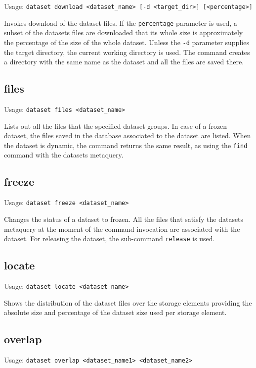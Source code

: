 Usage: \texttt{dataset download <dataset\_name>  [-d <target\_dir>]
[<percentage>]}

Invokes download of the dataset files. If the \texttt{percentage}
parameter is used, a subset of the datasets files are downloaded
that its whole size is approximately the percentage of the size
of the whole dataset. Unless the \texttt{-d} parameter supplies the
target directory, the current working directory is used. The
command creates a directory with the same name as the dataset and
all the files are saved there.

\subsection{files}

Usage: \texttt{dataset files <dataset\_name>}

Lists out all the files that the specified dataset groups. In case
of a frozen dataset, the files saved in the database associated
to the dataset are listed. When the dataset is dynamic, the command
returns the same result, as using the \texttt{find} command with
the datasets metaquery.

\subsection{freeze}

Usage: \texttt{dataset freeze <dataset\_name>}

Changes the status of a dataset to frozen. All the files that
satisfy the datasets metaquery at the moment of the command
invocation are associated with the dataset. For releasing the
dataset, the sub-command \texttt{release} is used.

\subsection{locate}

Usage: \texttt{dataset locate <dataset\_name>}

Shows the distribution of the dataset files over the storage
elements providing the absolute size and percentage of the dataset
size used per storage element.

\subsection{overlap}

Usage: \texttt{dataset overlap <dataset\_name1> <dataset\_name2> }

